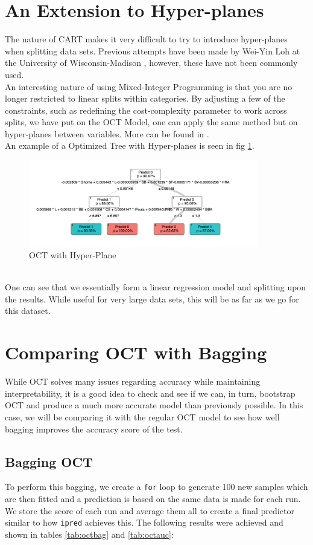 \documentclass[11pt,a4paper]{report}
\begin{document}
\section{An Extension to Hyper-planes}
The nature of CART makes it very difficult to try to introduce hyper-planes when splitting data sets. 
Previous attempts have been made by Wei-Yin Loh at the University of Wisconsin-Madison \cite{fact}, however, these have not been commonly used.
\medskip\\
An interesting nature of using Mixed-Integer Programming is that you are no longer restricted to linear splits within categories. 
By adjusting a few of the constraints, such as redefining the cost-complexity parameter to work across splits, we have put on the OCT Model, one can apply the same method but on hyper-planes between variables. 
More can be found in \cite{oct}.
\medskip\\
An example of a Optimized Tree with Hyper-planes is seen in fig \ref{fig:octhyp}.
\begin{figure}
    \centering
    \includegraphics[width = 10cm]{reportcharts/octhyp.png}
    \caption{OCT with Hyper-Plane}
    \label{fig:octhyp}
\end{figure}\\
One can see that we essentially form a linear regression model and splitting upon the results.
While useful for very large data sets, this will be as far as we go for this dataset.


\section{Comparing OCT with Bagging}
While OCT solves many issues regarding accuracy while maintaining interpretability, it is a good idea to check and see if we can, in turn, bootstrap OCT and produce a much more accurate model than previously possible.
In this case, we will be comparing it with the regular OCT model to see how well bagging improves the accuracy score of the test.

\subsection{Bagging OCT}
To perform this bagging, we create a \texttt{for} loop to generate 100 new samples which are then fitted and a prediction is based on the same data is made for each run.
We store the score of each run and average them all to create a final predictor similar to how {\color{blue} \texttt{ipred}} achieves this.
The following results were achieved and shown in tables \ref{tab:octbag} and \ref{tab:octauc}:
\end{document}
